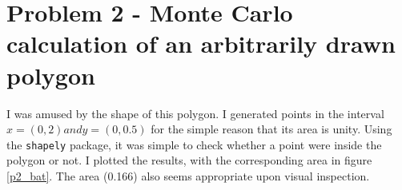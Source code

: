 \documentclass[a4paper,11pt]{article}
\begin{document}
\begin{titlepage}
  \centering
  \begin{figure}
  \end{figure}
\end{titlepage}


\section{Problem 2 - Monte Carlo calculation of an arbitrarily drawn polygon}
I was amused by the shape of this polygon.
I generated points in the interval $x = (0,2) and y = (0, 0.5)$ for the simple reason that its area is unity.
Using the \texttt{shapely} package, it was simple to check whether a point were inside the polygon or not.
I plotted the results, with the corresponding area in figure \ref{p2_bat}.
The area (0.166) also seems appropriate upon visual inspection.
\end{document}
